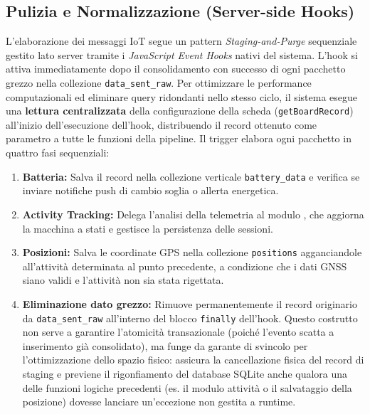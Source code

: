 \documentclass[12pt,a4paper]{article}
\begin{document}
\subsection{Pulizia e Normalizzazione (Server-side Hooks)}
L'elaborazione dei messaggi IoT segue un pattern \textit{Staging-and-Purge} sequenziale gestito lato server tramite i \textit{JavaScript Event Hooks} nativi del sistema. L'hook  si attiva immediatamente dopo il consolidamento con successo di ogni pacchetto grezzo nella collezione \texttt{data\_sent\_raw}. 
Per ottimizzare le performance computazionali ed eliminare query ridondanti nello stesso ciclo, il sistema esegue una \textbf{lettura centralizzata} della configurazione della scheda (\texttt{getBoardRecord}) all'inizio dell'esecuzione dell'hook, distribuendo il record ottenuto come parametro a tutte le funzioni della pipeline. Il trigger elabora ogni pacchetto in quattro fasi sequenziali:
\begin{enumerate}
    \item \textbf{Batteria:} Salva il record nella collezione verticale \texttt{battery\_data} e verifica se inviare notifiche push di cambio soglia o allerta energetica.
    \item \textbf{Activity Tracking:} Delega l'analisi della telemetria al modulo , che aggiorna la macchina a stati e gestisce la persistenza delle sessioni.
    \item \textbf{Posizioni:} Salva le coordinate GPS nella collezione \texttt{positions} agganciandole all'attività determinata al punto precedente, a condizione che i dati GNSS siano validi e l'attività non sia stata rigettata.
    \item \textbf{Eliminazione dato grezzo:} Rimuove permanentemente il record originario da \texttt{data\_sent\_raw} all'interno del blocco \texttt{finally} dell'hook. Questo costrutto non serve a garantire l'atomicità transazionale (poiché l'evento scatta a inserimento già consolidato), ma funge da garante di svincolo per l'ottimizzazione dello spazio fisico: assicura la cancellazione fisica del record di staging e previene il rigonfiamento del database SQLite anche qualora una delle funzioni logiche precedenti (es. il modulo attività o il salvataggio della posizione) dovesse lanciare un'eccezione non gestita a runtime.
\end{enumerate}
\end{document}
